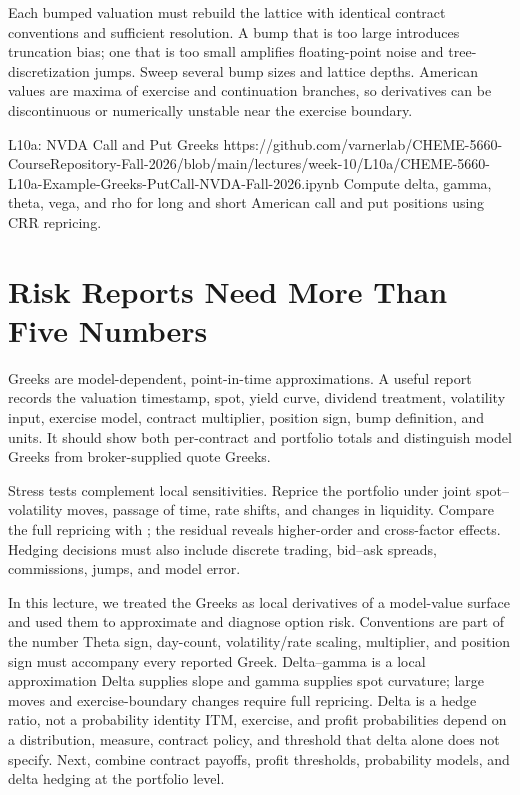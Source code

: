 \documentclass[11pt]{article}
\begin{document}
Each bumped valuation must rebuild the lattice with identical contract conventions and sufficient resolution. A bump that is too large introduces truncation bias; one that is too small amplifies floating-point noise and tree-discretization jumps. Sweep several bump sizes and lattice depths. American values are maxima of exercise and continuation branches, so derivatives can be discontinuous or numerically unstable near the exercise boundary.

\notebooklink
  {L10a: NVDA Call and Put Greeks}
  {https://github.com/varnerlab/CHEME-5660-CourseRepository-Fall-2026/blob/main/lectures/week-10/L10a/CHEME-5660-L10a-Example-Greeks-PutCall-NVDA-Fall-2026.ipynb}
  {Compute delta, gamma, theta, vega, and rho for long and short American call and put positions using CRR repricing.}

\section{Risk Reports Need More Than Five Numbers}

Greeks are model-dependent, point-in-time approximations. A useful report records the valuation timestamp, spot, yield curve, dividend treatment, volatility input, exercise model, contract multiplier, position sign, bump definition, and units. It should show both per-contract and portfolio totals and distinguish model Greeks from broker-supplied quote Greeks.

Stress tests complement local sensitivities. Reprice the portfolio under joint spot--volatility moves, passage of time, rate shifts, and changes in liquidity. Compare the full repricing with ; the residual reveals higher-order and cross-factor effects. Hedging decisions must also include discrete trading, bid--ask spreads, commissions, jumps, and model error.

\Needspace{0.38\textheight}
\keytakeaways
  {In this lecture, we treated the Greeks as local derivatives of a model-value surface and used them to approximate and diagnose option risk.}
  {Conventions are part of the number}
  {Theta sign, day-count, volatility/rate scaling, multiplier, and position sign must accompany every reported Greek.}
  {Delta--gamma is a local approximation}
  {Delta supplies slope and gamma supplies spot curvature; large moves and exercise-boundary changes require full repricing.}
  {Delta is a hedge ratio, not a probability identity}
  {ITM, exercise, and profit probabilities depend on a distribution, measure, contract policy, and threshold that delta alone does not specify.}
  {Next, combine contract payoffs, profit thresholds, probability models, and delta hedging at the portfolio level.}
\end{document}
